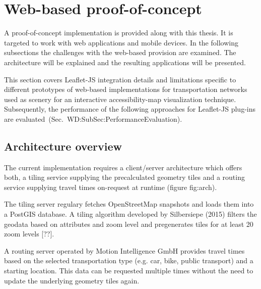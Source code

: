 
\cleardoublepage              %
\chapter{Web-based proof-of-concept}
  A proof-of-concept implementation is provided along with this thesis. It is targeted to work with web applications and mobile devices. In the following subsections the challenges with the web-based provision are examined. The architecture will be explained and the resulting applications will be presented.\par
  This section covers Leaflet-JS integration details and limitations specific to
  different prototypes of web-based implementations for transportation networks
  used as scenery for an interactive accessibility-map visualization technique.
  Subsequently, the performance of the following approaches for Leaflet-JS plug-ins
  are evaluated~(Sec.~{WD:SubSec:PerformanceEvaluation}).\par
  \section{Architecture overview}
    The current implementation requires a client/server architecture which offers both, a tiling service supplying the precalculated geometry tiles and a routing service supplying travel times on-request at runtime (figure {fig:arch}).


    The tiling server regulary fetches OpenStreetMap snapshots and loads them into a PostGIS database. A tiling algorithm developed by Silbersiepe (2015) filters the geodata based on attributes and zoom level and pregenerates tiles for at least 20 zoom levels [??].\par
    A routing server operated by Motion Intelligence GmbH provides travel times based on the selected transportation type (e.g. car, bike, public transport) and a starting location. This data can be requested multiple times without the need to update the underlying geometry tiles again.\par

